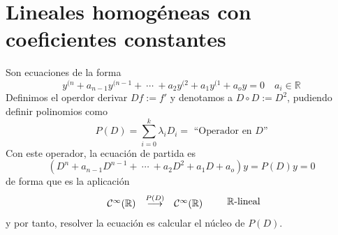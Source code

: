 \section{Lineales homogéneas con coeficientes constantes}
Son ecuaciones de la forma
$$y^{(n}+a_{n-1}y^{(n-1}+ \: \cdots \: + a_2 y^{(2}+a_1y^{(1}+a_oy=0 \quad a_i \in \mathbb R$$
Definimos el operdor derivar $Df:=f'$ y denotamos a $D \circ D := D^2$, pudiendo definir polinomios como
$$P(D)=\sum_{i=0}^{k} \lambda_i D_i=\text{ ``Operador en }D\text{''}$$
Con este operador, la ecuación de partida es 
$$(D^{n}+a_{n-1}D^{n-1}+ \: \cdots \: + a_2 D^{2}+a_1D+a_o)y=P(D)y=0$$
de forma que es la aplicación 
$$\begin{array}{rcl}
     \mathcal{C}^{\infty} (\mathbb R) & \overset{P(D)}{\longrightarrow} &  \mathcal{C}^{\infty} (\mathbb R)   \\
\end{array} \qquad \mathbb R \text{-lineal}$$
y por tanto, resolver la ecuación es calcular el núcleo de $P(D)$.
